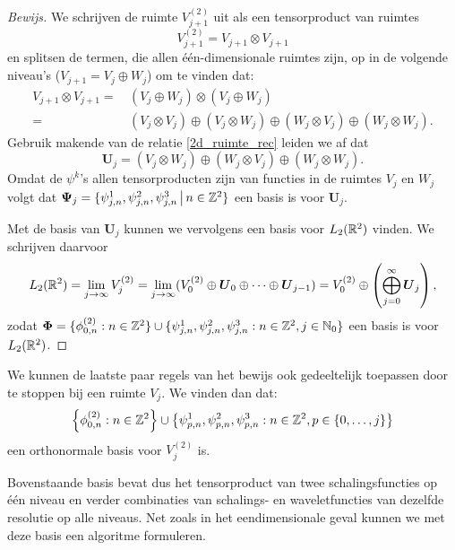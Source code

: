 \begin{proof}[Bewijs]
  We schrijven de ruimte $V_{j+1}^{(2)}$ uit als een tensorproduct van ruimtes
  \[
  V_{j+1}^{(2)} = V_{j+1} \otimes V_{j+1}
  \]
  en splitsen de termen, die allen \'e\'en-dimensionale ruimtes zijn, op in de volgende niveau's
  ($V_{j+1} = V_j \oplus W_j$) om te vinden dat:
  \begin{equation*}
  \begin{split}
    V_{j+1} \otimes V_{j+1} =&\, ( V_j \oplus W_j ) \otimes (V_j \oplus W_j ) \\ 
                            =&\, (V_j \otimes V_j) \oplus (V_j \otimes W_j) 
                        \oplus (W_j \otimes V_j) \oplus (W_j \otimes W_j).
  \end{split}
  \end{equation*}
  Gebruik makende van de relatie \eqref{2d_ruimte_rec} leiden we af dat 
  \[
    \boldsymbol{U}_j = (V_j \otimes W_j) \oplus (W_j \otimes V_j) \oplus (W_j \otimes W_j).
  \]
  Omdat de $\psi^k$'s allen tensorproducten zijn van functies in de ruimtes $V_j$ en $W_j$ volgt
  dat $\boldsymbol\Psi_j = \{ \psi^1_{j,n}, \psi^2_{j,n}, \psi^3_{j,n} \,\big|\,  n \in \mathbb{Z}^2 \}$ 
  een basis is voor $\boldsymbol{U}_j$.

  Met de basis van $\boldsymbol{U}_j$ kunnen we vervolgens een basis voor $L_2(\mathbb{R}^2)$ vinden. We schrijven daarvoor
  \[
  L_2(\mathbb{R}^2) = \lim_{j \to \infty} V_j^{(2)} = 
  \lim_{j \to \infty} ( V_0^{(2)} \oplus \boldsymbol{U}_0 \oplus \cdots \oplus \boldsymbol{U}_{j-1} ) = 
   V_0^{(2)} \oplus \left( \bigoplus_{j=0}^\infty \boldsymbol{U}_j \right),
  \]
  zodat
  $\boldsymbol{\Phi} = \{ \phi^{(2)}_{0, n}: n \in \mathbb{Z}^2 \} \cup \{ \psi^1_{j,n}, \psi^2_{j,n}, \psi^3_{j,n}: n \in \mathbb{Z}^2, j \in \mathbb{N}_0 \}$
  een basis is voor $L_2(\mathbb{R}^2)$.
\end{proof}
\begin{gevolg}
We kunnen de laatste paar regels van het bewijs ook gedeeltelijk toepassen door te stoppen bij een ruimte $V_j$.
We vinden dan dat: 
\[
\left\{ \phi^{(2)}_{0, n}: n \in \mathbb{Z}^2 \right\} \cup 
\left\{ \psi^1_{p,n}, \psi^2_{p,n}, \psi^3_{p,n}: n \in \mathbb{Z}^2, 
p \in \{0, \ldots, j \}  \right\}
\]
een orthonormale basis voor $V_j^{(2)}$ is.
\end{gevolg}

Bovenstaande basis bevat dus het tensorproduct van twee schalingsfuncties op \'e\'en niveau 
en verder combinaties van schalings- en waveletfuncties van dezelfde resolutie op alle niveaus. 
Net zoals in het eendimensionale geval kunnen we met deze basis een algoritme formuleren.

